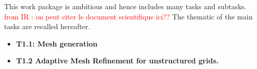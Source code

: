 This work package is ambitious and hence includes many tasks and subtasks. \textcolor{red}{from IR : on peut citer le document scientifique ici??} The thematic of the main tasks are recalled hereafter.
\begin{itemize}
    \item {\bf T1.1: Mesh generation}\\
    \item {\bf T1.2 Adaptive Mesh Refinement for unstructured grids.} 

\end{itemize}

